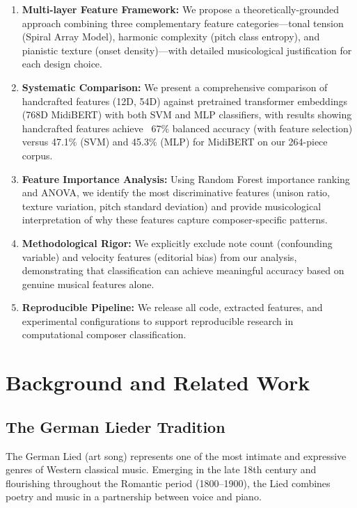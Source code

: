 \documentclass{article}
\begin{document}
\begin{enumerate}
    \item \textbf{Multi-layer Feature Framework:} We propose a theoretically-grounded approach combining three complementary feature categories---tonal tension (Spiral Array Model), harmonic complexity (pitch class entropy), and pianistic texture (onset density)---with detailed musicological justification for each design choice.
    
    \item \textbf{Systematic Comparison:} We present a comprehensive comparison of handcrafted features (12D, 54D) against pretrained transformer embeddings (768D MidiBERT) with both SVM and MLP classifiers, with results showing handcrafted features achieve ~67\% balanced accuracy (with feature selection) versus 47.1\% (SVM) and 45.3\% (MLP) for MidiBERT on our 264-piece corpus.
    
    \item \textbf{Feature Importance Analysis:} Using Random Forest importance ranking and ANOVA, we identify the most discriminative features (unison ratio, texture variation, pitch standard deviation) and provide musicological interpretation of why these features capture composer-specific patterns.
    
    \item \textbf{Methodological Rigor:} We explicitly exclude note count (confounding variable) and velocity features (editorial bias) from our analysis, demonstrating that classification can achieve meaningful accuracy based on genuine musical features alone.
    
    \item \textbf{Reproducible Pipeline:} We release all code, extracted features, and experimental configurations to support reproducible research in computational composer classification.
\end{enumerate}

\section{Background and Related Work}\label{sec:background}

\subsection{The German Lieder Tradition}

The German Lied (art song) represents one of the most intimate and expressive genres of Western classical music. Emerging in the late 18th century and flourishing throughout the Romantic period (1800--1900), the Lied combines poetry and music in a partnership between voice and piano.
\end{document}
